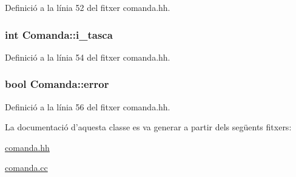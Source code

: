Definició a la línia 52 del fitxer comanda.\-hh.

\hypertarget{class_comanda_aab152fe48a937f449c027a2274fc31e7}{
\subsubsection[{i\-\_\-tasca}]{\setlength{\rightskip}{0pt plus 5cm}int Comanda\-::i\-\_\-tasca\hspace{0.3cm}{\ttfamily [private]}}}\label{class_comanda_aab152fe48a937f449c027a2274fc31e7}


Definició a la línia 54 del fitxer comanda.\-hh.

\hypertarget{class_comanda_a9a1bf4bf74940a4bac90140e67d11972}{
\subsubsection[{error}]{\setlength{\rightskip}{0pt plus 5cm}bool Comanda\-::error\hspace{0.3cm}{\ttfamily [private]}}}\label{class_comanda_a9a1bf4bf74940a4bac90140e67d11972}


Definició a la línia 56 del fitxer comanda.\-hh.



La documentació d'aquesta classe es va generar a partir dels següents fitxers\-:\begin{DoxyCompactItemize}
\item 
\hyperlink{comanda_8hh}{comanda.\-hh}\item 
\hyperlink{comanda_8cc}{comanda.\-cc}\end{DoxyCompactItemize}
